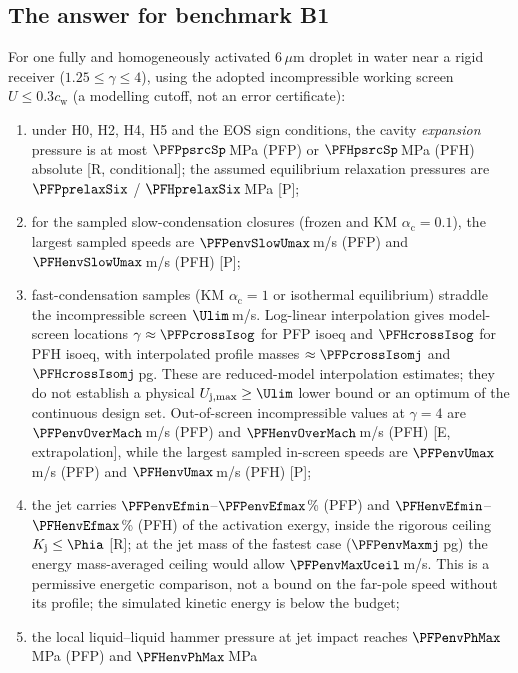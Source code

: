 \subsection{The answer for benchmark B1}
\begin{benchmark}\label{prop:B1}
For one fully and homogeneously activated 6\,$\mu$m droplet in water near a rigid receiver
($1.25\le\gamma\le4$), using the adopted incompressible working screen $U\le0.3c_{\mathrm w}$
(a modelling cutoff, not an error certificate):
\begin{enumerate}[leftmargin=*]
\item under H0, H2, H4, H5 and the EOS sign conditions, the cavity \emph{expansion} pressure is at most
$\PFPpsrcSp$\,MPa (PFP) or $\PFHpsrcSp$\,MPa (PFH) absolute \textup{[R, conditional]};
the assumed equilibrium relaxation pressures are $\PFPprelaxSix$ / $\PFHprelaxSix$\,MPa \textup{[P]};
\item for the sampled slow-condensation closures (frozen and KM $\alpha_{\mathrm c}=0.1$), the largest sampled speeds are
$\PFPenvSlowUmax$\,m/s (PFP) and $\PFHenvSlowUmax$\,m/s (PFH) \textup{[P]};
\item fast-condensation samples (KM $\alpha_{\mathrm c}=1$ or isothermal equilibrium) straddle the
incompressible screen $\Ulim$\,m/s. Log-linear interpolation gives model-screen locations
$\gamma\approx\PFPcrossIsog$ for PFP isoeq and $\PFHcrossIsog$ for PFH isoeq,
with interpolated profile masses $\approx\PFPcrossIsomj$ and $\PFHcrossIsomj$\,pg.
These are reduced-model interpolation estimates; they do not establish a physical
$U_{\mathrm j,\max}\ge\Ulim$ lower bound or an optimum of the continuous design set.
Out-of-screen incompressible values at $\gamma=4$ are $\PFPenvOverMach$\,m/s (PFP) and
$\PFHenvOverMach$\,m/s (PFH) \textup{[E, extrapolation]}, while the largest sampled in-screen speeds
are $\PFPenvUmax$\,m/s (PFP) and $\PFHenvUmax$\,m/s (PFH) \textup{[P]};
\item the jet carries $\PFPenvEfmin$--$\PFPenvEfmax$\% (PFP) and $\PFHenvEfmin$--$\PFHenvEfmax$\% (PFH) of the activation
exergy, inside the rigorous ceiling $K_{\mathrm j}\le\Phia$ \textup{[R]}; at the jet mass of the fastest case ($\PFPenvMaxmj$\,pg) the energy
mass-averaged ceiling would allow $\PFPenvMaxUceil$\,m/s. This is a permissive energetic comparison,
not a bound on the far-pole speed without its profile; the simulated kinetic energy is below the budget;
\item the local liquid--liquid hammer pressure at jet impact reaches $\PFPenvPhMax$\,MPa (PFP) and $\PFHenvPhMax$\,MPa

\end{enumerate}
\end{benchmark}

